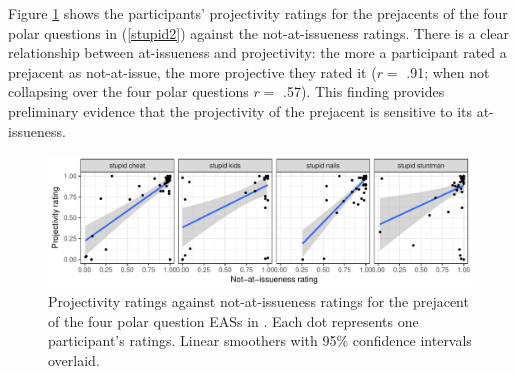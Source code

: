 \documentclass[11pt,fleqn]{article}
\newcommand{\6}{\mbox{$[\hspace*{-.6mm}[$}}
\newcommand{\9}{\mbox{$]\hspace*{-.6mm}]$}}
\begin{document}
Figure \ref{f-corr} shows the participants' projectivity ratings for the prejacents of the four polar questions in (\ref{stupid2}) against the not-at-issueness ratings. There is a clear relationship between at-issueness and projectivity: the more a participant rated a prejacent as not-at-issue, the more projective they rated it ($r =$ .91; when not collapsing over the four polar questions $r =$ .57). This finding provides preliminary evidence that the projectivity of the prejacent is sensitive to its at-issueness.

\begin{figure}[h!]
\centering

\includegraphics[width=1\textwidth]{figures/Exp1a-subject-projai-stupid}

\caption{Projectivity ratings against not-at-issueness ratings for the prejacent of the four polar question EASs in \citealt{tbd-variability}. Each dot represents one participant's ratings. Linear smoothers with 95\% confidence intervals overlaid.}
\label{f-corr}
\end{figure}
\end{document}
